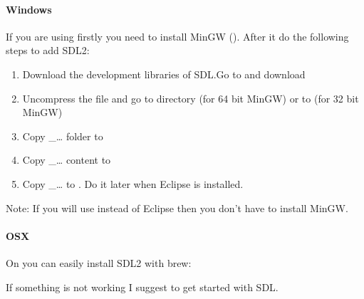 \documentclass[letterpaper,10pt,english]{sphinxmanual}
\begin{document}
\paragraph{Windows}
\label{\detokenize{get-started/pc-simulator:windows}}
If you are using  firstly you need to install MinGW (). After it do the following steps to add SDL2:
\begin{enumerate}
\def\theenumi{\arabic{enumi}}
\def\labelenumi{\theenumi .}
\makeatletter\def\p@enumii{\p@enumi \theenumi .}\makeatother
\item {} 
Download the development libraries of SDL.Go to  and download 

\item {} 
Uncompress the file and go to  directory (for 64 bit MinGW) or to  (for 32 bit MinGW)

\item {} 
Copy \_… folder to 

\item {} 
Copy \_… content to 

\item {} 
Copy \_… to .  Do it later when Eclipse is installed.

\end{enumerate}

Note: If you will use  instead of Eclipse then you don’t have to install MinGW.


\paragraph{OSX}
\label{\detokenize{get-started/pc-simulator:osx}}
On  you can easily install SDL2 with brew: 

If something is not working I suggest  to get started with SDL.
\end{document}
